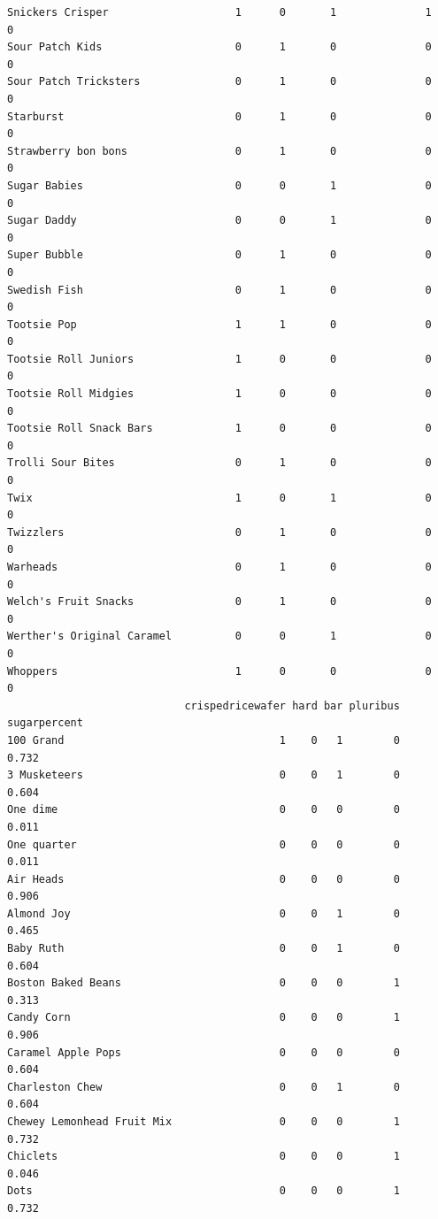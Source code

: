 \documentclass[
  letterpaper,
  DIV=11,
  numbers=noendperiod]{scrartcl}
\begin{document}
\begin{verbatim}
Snickers Crisper                    1      0       1              1      0
Sour Patch Kids                     0      1       0              0      0
Sour Patch Tricksters               0      1       0              0      0
Starburst                           0      1       0              0      0
Strawberry bon bons                 0      1       0              0      0
Sugar Babies                        0      0       1              0      0
Sugar Daddy                         0      0       1              0      0
Super Bubble                        0      1       0              0      0
Swedish Fish                        0      1       0              0      0
Tootsie Pop                         1      1       0              0      0
Tootsie Roll Juniors                1      0       0              0      0
Tootsie Roll Midgies                1      0       0              0      0
Tootsie Roll Snack Bars             1      0       0              0      0
Trolli Sour Bites                   0      1       0              0      0
Twix                                1      0       1              0      0
Twizzlers                           0      1       0              0      0
Warheads                            0      1       0              0      0
Welch's Fruit Snacks                0      1       0              0      0
Werther's Original Caramel          0      0       1              0      0
Whoppers                            1      0       0              0      0
                            crispedricewafer hard bar pluribus sugarpercent
100 Grand                                  1    0   1        0        0.732
3 Musketeers                               0    0   1        0        0.604
One dime                                   0    0   0        0        0.011
One quarter                                0    0   0        0        0.011
Air Heads                                  0    0   0        0        0.906
Almond Joy                                 0    0   1        0        0.465
Baby Ruth                                  0    0   1        0        0.604
Boston Baked Beans                         0    0   0        1        0.313
Candy Corn                                 0    0   0        1        0.906
Caramel Apple Pops                         0    0   0        0        0.604
Charleston Chew                            0    0   1        0        0.604
Chewey Lemonhead Fruit Mix                 0    0   0        1        0.732
Chiclets                                   0    0   0        1        0.046
Dots                                       0    0   0        1        0.732

\end{verbatim}
\end{document}
